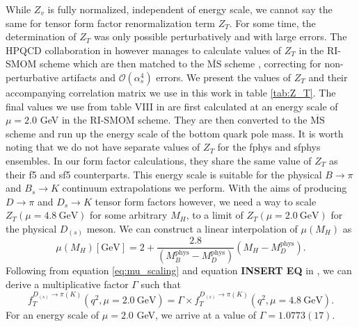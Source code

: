 While $Z_v$ is fully normalized, independent of energy scale, we cannot say the same for tensor form factor renormalization term $Z_T$. For some time, the determination of $Z_T$ was only possible perturbatively and with large errors. The HPQCD collaboration in \cite{Hatton_2020} however manages to calculate values of $Z_T$ in the RI-SMOM scheme \cite{Martinelli_1995} which are then matched to the $\overline{\mathrm{MS}}$ scheme \cite{THOOFT1973455, PhysRevD.8.3497},  correcting for non-perturbative artifacts and $\mathcal{O}(\alpha_s^4)$ errors.  We present the values of $Z_T$ and their accompanying correlation matrix we use in this work in table \ref{tab:Z_T}.  The final values we use from table VIII in \cite{Hatton_2020} are first calculated at an energy scale of $\mu=2.0$ GeV in the RI-SMOM scheme.  They are then converted to the $\overline{\mathrm{MS}}$ scheme and run up the energy scale of the bottom quark pole mass.  It is worth noting that we do not have separate values of $Z_T$ for the fphys and sfphys ensembles. In our form factor calculations, they share the same value of $Z_T$ as their f5 and sf5 counterparts. %
This energy scale is suitable for the physical $B\rightarrow\pi$ and $B_s \rightarrow K$ continuum extrapolations we perform.  With the aims of producing $D\rightarrow\pi$ and $D_s \rightarrow K$ tensor form factors however, we need a way to scale $Z_T(\mu = 4.8 \ \mathrm{GeV})$ for some arbitrary $M_H$, to a limit of $Z_T(\mu = 2.0 \ \mathrm{GeV})$ for the physical $D_{(s)}$ meson.  We can construct a linear interpolation of $\mu(M_H)$ as
\begin{equation}\label{eq:mu_scaling}
    \mu(M_H)[\mathrm{GeV}] = 2 + \frac{2.8}{(M_B^\mathrm{phys} - M_D^\mathrm{phys})}(M_H - M_D^\mathrm{phys}).
\end{equation}
Following from equation \ref{eq:mu_scaling} and equation \textbf{INSERT EQ} in \cite{Hatton_2020}, we can derive a multiplicative factor $\Gamma$ such that
\begin{equation}\label{eq:charm_tensor_scaling}
    f_T^{D_{(s)}\rightarrow\pi(K)}(q^2, \mu = 2.0 \ \mathrm{GeV}) = \Gamma \times f_T^{D_{(s)}\rightarrow\pi(K)}(q^2, \mu = 4.8 \ \mathrm{GeV}).
\end{equation}
For an energy scale of $\mu = 2.0$ GeV, we arrive at a value of $\Gamma = 1.0773(17)$.




